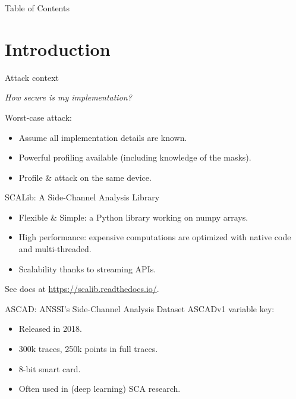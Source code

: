 \documentclass[aspectratio=169]{beamer}
\begin{document}

\begin{frame}{Table of Contents}
    \tableofcontents
\end{frame}

\section{Introduction}

\begin{frame}{Attack context}
    \begin{center}
        \emph{How secure is my implementation?}
    \end{center}

    Worst-case attack:
    \begin{itemize}
        \item Assume all implementation details are known.
        \item Powerful profiling available (including knowledge of the masks).
        \item Profile \& attack on the same device.
    \end{itemize}
\end{frame}

\begin{frame}{SCALib: A Side-Channel Analysis Library}
    \begin{itemize}
        \item Flexible \& Simple: a Python library working on numpy arrays.
        \item High performance: expensive computations are optimized with native code and multi-threaded.
        \item Scalability thanks to streaming APIs.
    \end{itemize}
    \begin{center}
        See docs at \url{https://scalib.readthedocs.io/}.
    \end{center}
\end{frame}

\begin{frame}{ASCAD: ANSSI's Side-Channel Analysis Dataset}
    ASCADv1 variable key:
    \begin{itemize}
        \item Released in 2018.
        \item 300k traces, 250k points in full traces.
        \item 8-bit smart card.
        \item Often used in (deep learning) SCA research.
    \end{itemize}
\end{frame}
\end{document}
